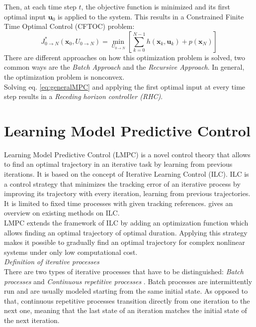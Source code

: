 Then, at each time step $t$, the objective function is minimized and its first optimal input $\bm{u}_0$ is applied to the system. This results in a Constrained Finite Time Optimal Control (CFTOC) problem:
\begin{equation}\label{eq:generalMPC}
J_{0\rightarrow N}^*(\bm{x}_0,U_{0\rightarrow N})=\min_{U_{0\rightarrow N}}\left[\sum_{k=0}^{N-1}h(\bm{x}_k,\bm{u}_k) + p(\bm{x}_N)\right]
\end{equation}
There are different approaches on how this optimization problem is solved, two common ways are the \emph{Batch Approach} and the \emph{Recursive Approach}. In general, the optimization problem is nonconvex.\\
Solving eq. \ref{eq:generalMPC} and applying the first optimal input at every time step results in a \emph{Receding horizon controller (RHC)}.

\section{Learning Model Predictive Control}\label{sec:LMPC}
Learning Model Predictive Control (LMPC) is a novel control theory that allows to find an optimal trajectory in an iterative task by learning from previous iterations. It is based on the concept of Iterative Learning Control (ILC). ILC is a control strategy that minimizes the tracking error of an iterative process by improving its trajectory with every iteration, learning from previous trajectories. It is limited to fixed time processes with given tracking references. \cite{Lee2007} gives an overview on existing methods on ILC.\\
LMPC extends the framework of ILC by adding an optimization function which allows finding an optimal trajectory of optimal duration. Applying this strategy makes it possible to gradually find an optimal trajectory for complex nonlinear systems under only low computational cost.\\
\emph{Definition of iterative processes}\\
There are two types of iterative processes that have to be distinguished: \emph{Batch processes} and \emph{Continuous repetitive processes} \cite{Wang2009}. Batch processes are intermittently run and are usually modeled starting from the same initial state. As opposed to that, continuous repetitive processes transition directly from one iteration to the next one, meaning that the last state of an iteration matches the initial state of the next iteration.
